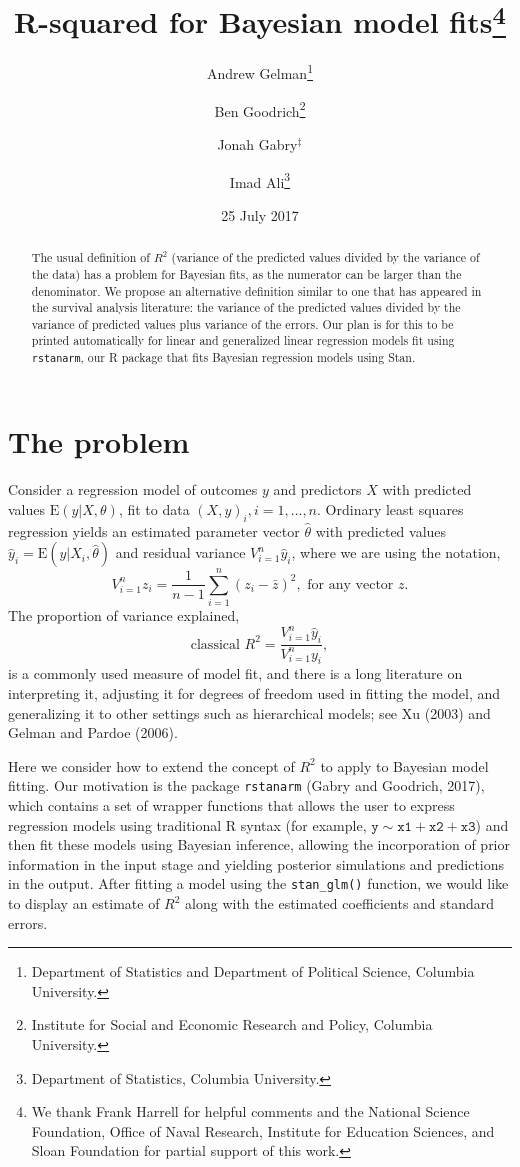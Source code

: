 \documentclass[11pt]{article}
\title{\bf R-squared for Bayesian model fits\footnote{We thank Frank Harrell for helpful comments and the National Science Foundation, Office of Naval Research, Institute for Education Sciences, and Sloan Foundation for partial support of this work.}\vspace{.1in}}
\author{Andrew Gelman\footnote{Department of Statistics and Department of Political Science, Columbia University.} \and Ben Goodrich\footnote{Institute for Social and Economic Research and Policy, Columbia University.} \and Jonah Gabry$^\ddagger$ \and Imad Ali\footnote{Department of Statistics, Columbia University.}\vspace{.1in}}
\date{25 July 2017\vspace{-.1in}}
\begin{document}
\sloppy
\maketitle
\thispagestyle{empty}

\begin{abstract}
The usual definition of $R^2$ (variance of the predicted values divided by the
variance of the data) has a problem for Bayesian fits, as the numerator can be
larger than the denominator.  We propose an alternative definition similar to 
one that has appeared in the survival analysis literature:  the variance of the 
predicted values divided by the variance of predicted values plus variance of 
the errors. Our plan is for this to be printed automatically for linear and 
generalized linear regression models fit using {\tt rstanarm}, our R package 
that fits Bayesian regression models using Stan.
\end{abstract}

\section{The problem}

Consider a regression model of outcomes $y$ and predictors $X$ with predicted
values $\mbox{E}(y|X,\theta)$, fit to data $(X,y)_i, i=1,\ldots,n$.  Ordinary
least squares regression yields an estimated parameter vector $\hat{\theta}$
with predicted values $\hat{y}_i=\mbox{E}(y|X_i,\hat{\theta})$ and residual
variance $V_{i=1}^n \hat{y}_i$, where we are using the notation,
%
$$
V_{i=1}^nz_i = \frac{1}{n-1}\sum_{i=1}^n(z_i-\bar{z})^2, \mbox{ for any vector }z.
$$
%
The proportion of variance explained,
%
\begin{equation}\label{rsq1}
\mbox{classical } R^2=\frac{V_{i=1}^n\hat{y}_i}{V_{i=1}^n y_i},
\end{equation}
%
is a commonly used measure of model fit, and there is a long literature on
interpreting it, adjusting it for degrees of freedom used in fitting the model,
and generalizing it to other settings such as hierarchical models; see Xu (2003)
and Gelman and Pardoe (2006).

Here we consider how to extend the concept of $R^2$ to apply to Bayesian model
fitting.  Our motivation is the package {\tt rstanarm} (Gabry and Goodrich,
2017), which contains a set of wrapper functions that allows the user to express
regression models using traditional R syntax
(for example, $\mathtt{y \sim x1 + x2 + x3}$)
and then fit these models using Bayesian inference, allowing the incorporation
of prior information in the input stage and yielding posterior simulations and
predictions in the output.  After fitting a model using the \verb#stan_glm()#
function, we would like to display an estimate of $R^2$ along with the estimated
coefficients and standard errors.
\end{document}
